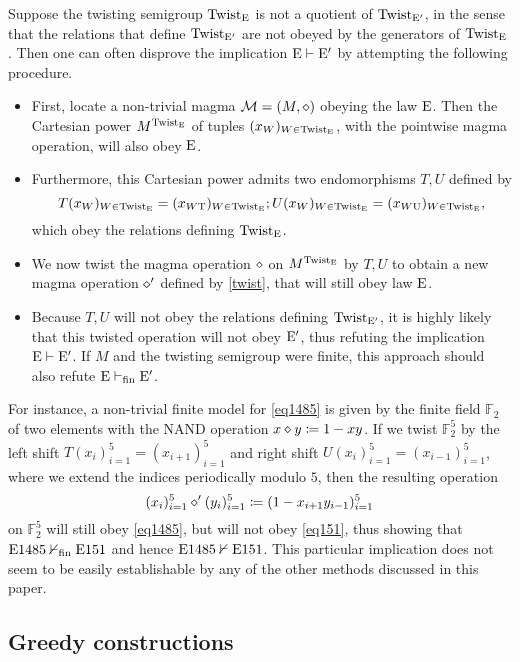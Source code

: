 Suppose the twisting semigroup $\operatorname{Twist}_{\mathrm{E}}$ is not a quotient of $\operatorname{Twist}_{{\mathrm{E}'}}$, in the sense that the relations that define $\operatorname{Twist}_{{\mathrm{E}'}}$ are not obeyed by the generators of $\operatorname{Twist}_{\mathrm{E}}$.  Then one can often disprove the implication $\mathrm{E} \vdash {\mathrm{E}'}$ by attempting the following procedure.
\begin{itemize}
\item First, locate a non-trivial magma ${\mathcal{M}} = (M,\diamond)$ obeying the law $\mathrm{E}$.  Then the Cartesian power $M^{\operatorname{Twist}_{\mathrm{E}}}$ of tuples $(x_W)_{W \in \operatorname{Twist}_{\mathrm{E}}}$, with the pointwise magma operation, will also obey $\mathrm{E}$.
\item Furthermore, this Cartesian power admits two endomorphisms $T, U$ defined by
$$ T (x_W)_{W \in \operatorname{Twist}_{\mathrm{E}}} = (x_{W \mathrm{T}})_{W \in \operatorname{Twist}_{\mathrm{E}}};
U (x_W)_{W \in \operatorname{Twist}_{\mathrm{E}}} = (x_{W \mathrm{U}})_{W \in \operatorname{Twist}_{\mathrm{E}}},$$
which obey the relations defining $\operatorname{Twist}_{\mathrm{E}}$.
\item We now twist the magma operation $\diamond$ on $M^{\operatorname{Twist}_{\mathrm{E}}}$ by $T,U$ to obtain a new magma operation $\diamond'$ defined by \eqref{twist}, that will still obey law $\mathrm{E}$.
\item Because $T, U$ will not obey the relations defining $\operatorname{Twist}_{{\mathrm{E}'}}$, it is highly likely that this twisted operation will not obey ${\mathrm{E}'}$, thus refuting the implication $\mathrm{E} \vdash {\mathrm{E}'}$.  If $M$ and the twisting semigroup were finite, this approach should also refute $\mathrm{E} \vdash_{\mathrm{fin}} {\mathrm{E}'}$.
\end{itemize}

For instance, a non-trivial finite model for \eqref{eq1485} is given by the finite field $\mathbb{F}_2$ of two elements with the NAND operation $x \diamond y \coloneqq 1-xy$.  If we twist $\mathbb{F}_2^5$ by the left shift $T(x_i)_{i=1}^5 = (x_{i+1})_{i=1}^5$ and right shift $U(x_i)_{i=1}^5 = (x_{i-1})_{i=1}^5$, where we extend the indices periodically modulo $5$, then the resulting operation
$$ (x_i)_{i=1}^5 \diamond' (y_i)_{i=1}^5 \coloneqq (1 - x_{i+1} y_{i-1})_{i=1}^5$$
on $\mathbb{F}_2^5$ will still obey \eqref{eq1485}, but will not obey \eqref{eq151}, thus showing that $\mathrm{E}1485 \nvdash_{\mathrm{fin}} \mathrm{E}151$ and hence $\mathrm{E}1485 \nvdash \mathrm{E}151$.  This particular implication does not seem to be easily establishable by any of the other methods discussed in this paper.

\subsection{Greedy constructions}\label{greedy-sec}

